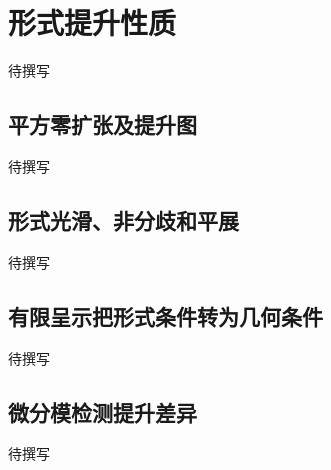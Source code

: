
% 
% 

\section{形式提升性质}
\label{g5:sec:1501}

待撰写

\subsection{平方零扩张及提升图}
\label{g5:subsec:1501:01}
待撰写

\subsection{形式光滑、非分歧和平展}
\label{g5:subsec:1501:02}
待撰写

\subsection{有限呈示把形式条件转为几何条件}
\label{g5:subsec:1501:03}
待撰写

\subsection{微分模检测提升差异}
\label{g5:subsec:1501:04}
待撰写
